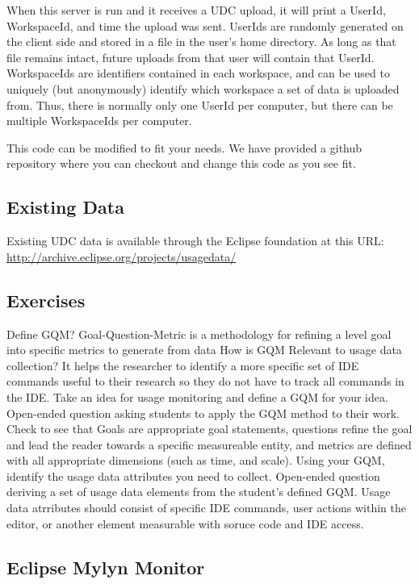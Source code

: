 \noindent
When this server is run and it receives a UDC upload, 
it will print a UserId, WorkspaceId, and time the upload was sent.
UserIds are randomly generated on the client side and stored in a file in
the user's home directory. 
As long as that file remains intact, future uploads from that user will
contain that UserId.
WorkspaceIds are identifiers contained in each workspace, and can be 
used to uniquely (but anonymously) identify which 
workspace a set of data is uploaded from.
Thus, there is normally only one UserId per computer, but there can
be multiple WorkspaceIds per computer.

This code can be modified to fit your needs.
We have provided a github repository where you can checkout 
and change this code as you see fit.

\subsection{Existing Data}

Existing UDC data is available through the Eclipse foundation at this URL:
\url{http://archive.eclipse.org/projects/usagedata/}

\subsection{Exercises}

\begin{ExerciseList}
 \Exercise[type={long}, difficulty={0}]Define GQM? 
  \Answer Goal-Question-Metric is a methodology for refining a level goal into specific metrics to generate from data
 \Exercise[ type={long}, difficulty={1}]How is GQM Relevant to usage data collection? 
  \Answer It helps the researcher to identify a more specific set of IDE commands useful to their research so they do not have to track all commands in the IDE.
  \Exercise[ type={long}, difficulty={2}]Take an idea for usage monitoring and define a GQM for your idea. 
  \Answer Open-ended question asking students to apply the GQM method to their work.  Check to see that Goals are appropriate goal statements, questions refine the goal and lead the reader towards a specific measureable entity, and metrics are defined with all appropriate dimensions (such as time, and scale).
  \Exercise[ type={long}, difficulty={2}]Using your GQM, identify the usage data attributes you need to collect. 
  \Answer Open-ended question deriving a set of usage data elements from the student's defined GQM.  Usage data atrributes should consist of specific IDE commands, user actions within the editor, or another element measurable with soruce code and IDE access. 

\end{ExerciseList}


\subsection{Eclipse Mylyn Monitor}
